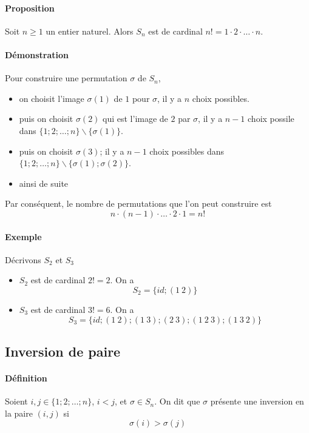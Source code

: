 \paragraph{Proposition} Soit $n \geq 1$ un entier naturel. Alors $S_n$ est de cardinal $n! = 1 \cdot 2 \cdot \ldots \cdot n$.

\paragraph{Démonstration} Pour construire une permutation $\sigma$ de $S_n$,
\begin{itemize}
  \item on choisit l'image $\sigma(1)$ de $1$ pour $\sigma$, il y a $n$ choix possibles.
  \item puis on choisit $\sigma(2)$ qui est l'image de $2$ par $\sigma$, il y a $n-1$ choix possile dans $\{1; 2; \ldots; n\} \backslash \{\sigma(1)\}$.
  \item puis on choisit $\sigma(3)$; il y a $n-1$ choix possibles dans $\{1; 2; \ldots; n\} \backslash \{\sigma(1); \sigma(2)\}$.
  \item ainsi de suite
\end{itemize}
Par conséquent, le nombre de permutations que l'on peut construire est 
$$n \cdot (n-1) \cdot \ldots \cdot 2 \cdot 1 = n!$$

\paragraph{Exemple} Décrivons $S_2$ et $S_3$
\begin{itemize}
  \item $S_2$ est de cardinal $2! = 2$. On a 
    $$S_2 = \{id; (1 ~ 2)\}$$
  \item $S_3$ est de cardinal $3! = 6$. On a
    $$S_3 = \{id; (1 ~ 2); (1 ~ 3); (2 ~ 3); (1 ~ 2 ~ 3); (1 ~ 3 ~ 2)\}$$
\end{itemize}

%
\subsection{Inversion de paire}
%
\paragraph{Définition} Soient $i, j \in \{1; 2; \ldots; n\}$, $i < j$, et $\sigma \in S_n$. On dit que $\sigma$ présente une inversion en la paire $(i, j)$ si 
$$\sigma(i) > \sigma(j)$$

